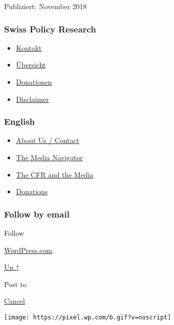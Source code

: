 Publiziert: November 2018

\hypertarget{swiss-policy-research}{%
\subsubsection{Swiss Policy Research}\label{swiss-policy-research}}

\begin{itemize}
\tightlist
\item
  \href{https://swprs.org/kontakt/}{Kontakt}
\item
  \href{https://swprs.org/uebersicht/}{Übersicht}
\item
  \href{https://swprs.org/donationen/}{Donationen}
\item
  \href{https://swprs.org/disclaimer/}{Disclaimer}
\end{itemize}

\hypertarget{english}{%
\subsubsection{English}\label{english}}

\begin{itemize}
\tightlist
\item
  \href{https://swprs.org/contact/}{About Us / Contact}
\item
  \href{https://swprs.org/media-navigator/}{The Media Navigator}
\item
  \href{https://swprs.org/the-american-empire-and-its-media/}{The CFR
  and the Media}
\item
  \href{https://swprs.org/donations/}{Donations}
\end{itemize}

\hypertarget{follow-by-email}{%
\subsubsection{Follow by email}\label{follow-by-email}}

Follow

\href{https://wordpress.com/?ref=footer_custom_com}{WordPress.com}.

\protect\hyperlink{}{Up ↑}

Post to

\protect\hyperlink{}{Cancel}

\texttt{[image: https://pixel.wp.com/b.gif?v=noscript]}

